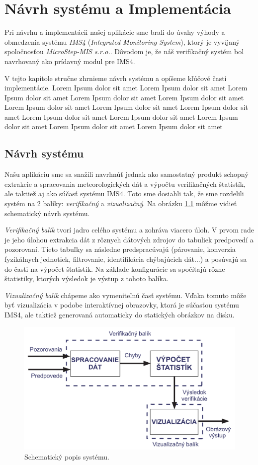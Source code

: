\chapter{Návrh systému a Implementácia}
Pri návrhu a implementácii našej aplikácie sme brali do úvahy výhody a obmedzenia systému \textit{IMS4} (\textit{Integrated Monitoring System}), ktorý je vyvíjaný spoločnosťou \textit{MicroStep-MIS s.r.o.}. Dôvodom je, že náš verifikačný systém bol navrhovaný ako prídavný modul pre IMS4.

V tejto kapitole stručne zhrnieme návrh systému a opíšeme kľúčové časti implementácie. 
Lorem Ipsum dolor sit amet Lorem Ipsum dolor sit amet Lorem Ipsum dolor sit amet Lorem Ipsum dolor sit amet Lorem Ipsum dolor sit amet Lorem Ipsum dolor sit amet Lorem Ipsum dolor sit amet Lorem Ipsum dolor sit amet Lorem Ipsum dolor sit amet Lorem Ipsum dolor sit amet Lorem Ipsum dolor sit amet Lorem Ipsum dolor sit amet Lorem Ipsum dolor sit amet


\section{Návrh systému}
\label{sec:sysdesign}
Našu aplikáciu sme sa snažili navrhnúť jednak ako samostatný produkt schopný extrakcie a spracovania meteorologických dát a výpočtu verifikačných štatistík, ale taktiež aj ako súčasť systému IMS4. Toto sme dosiahli tak, že sme rozdelili systém na 2 balíky: \textit{verifikačný} a \textit{vizualizačný}. Na obrázku \ref{fig:system} môžme vidieť schematický návrh systému.

\textit{Verifikačný balík} tvorí jadro celého systému a zohráva viacero úloh. V prvom rade je jeho úlohou extrakcia dát z rôznych dátových zdrojov do tabuliek predpovedí a pozorovaní. Tieto tabuľky sa následne predspracúvajú (párovanie, konverzia fyzikálnych jednotiek, filtrovanie, identifikácia chýbajúcich dát...) a posúvajú sa do časti na výpočet štatistík. Na základe konfigurácie sa spočítajú rôzne štatistiky, ktorých výsledok je výstup z tohoto balíka.

\textit{Vizualizačný balík} chápeme ako vymeniteľnú časť systému. Vďaka tomuto môže byť vizualizácia v podobe interaktívnej obrazovky, ktorá je súčasťou systému IMS4, ale taktiež generovaná automaticky do statických obrázkov na disku.

\begin{figure}
	\centering
	\includegraphics[width = 5in]{system}
	\caption{Schematický popis systému.}
	\label{fig:system} 
\end{figure}


